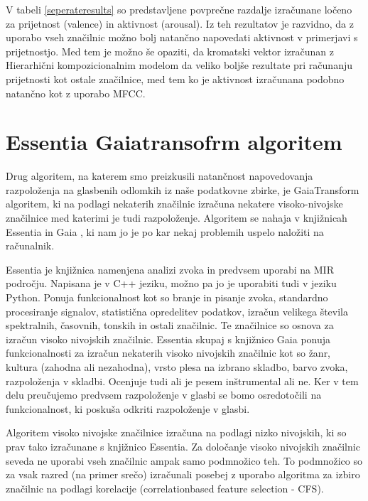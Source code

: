 \documentclass[a4paper, 12pt]{book}
\begin{document}
{V tabeli \ref{seperateresults} so predstavljene povprečne razdalje  izračunane ločeno za prijetnost (valence) in aktivnost (arousal). Iz teh rezultatov je razvidno, da z uporabo vseh značilnic možno bolj natančno  napovedati aktivnost v primerjavi s prijetnostjo. Med tem je možno še opaziti, da kromatski vektor izračunan z Hierarhični kompozicionalnim modelom da veliko boljše rezultate pri računanju prijetnosti kot ostale značilnice, med tem ko je aktivnost izračunana podobno natančno kot z uporabo MFCC. 



\section{Essentia Gaiatransofrm algoritem}

Drug algoritem, na katerem smo preizkusili natančnost napovedovanja razpoloženja na glasbenih odlomkih iz naše podatkovne zbirke, je GaiaTransform algoritem, ki na podlagi nekaterih značilnic izračuna nekatere visoko-nivojske značilnice \cite{bogdanov2013form} med katerimi je tudi razpoloženje. Algoritem se nahaja v knjižnicah Essentia in Gaia \cite{bogdanov2013essentia}, ki nam jo je po kar nekaj problemih uspelo naložiti na računalnik. 

Essentia je knjižnica namenjena analizi zvoka in predvsem uporabi na MIR področju. Napisana je v C++ jeziku, možno pa jo je uporabiti tudi v jeziku Python. Ponuja funkcionalnost kot so branje in pisanje zvoka, standardno procesiranje signalov, statistična opredelitev podatkov, izračun velikega števila spektralnih, časovnih, tonskih in ostali značilnic. Te značilnice so osnova za izračun visoko nivojskih značilnic. Essentia skupaj s knjižnico Gaia ponuja funkcionalnosti za izračun nekaterih visoko nivojskih značilnic kot so žanr, kultura (zahodna ali nezahodna), vrsto plesa na izbrano skladbo, barvo zvoka, razpoloženja v skladbi. Ocenjuje tudi ali je pesem inštrumental ali ne. Ker v tem delu preučujemo predvsem razpoloženje v glasbi se bomo osredotočili na funkcionalnost, ki poskuša odkriti razpoloženje v glasbi.

Algoritem visoko nivojske značilnice izračuna na podlagi nizko nivojskih, ki so prav tako izračunane s knjižnico Essentia. Za določanje visoko nivojskih značilnic seveda ne uporabi vseh značilnic ampak samo podmnožico teh. To podmnožico so za vsak razred (na primer srečo) izračunali posebej z uporabo algoritma za izbiro značilnic na podlagi korelacije (correlationbased feature selection - CFS). 

}
\end{document}
